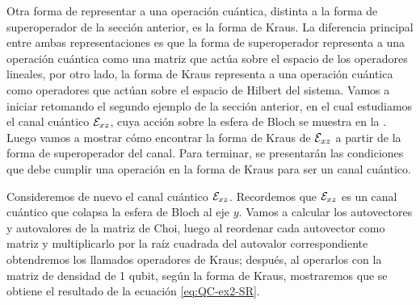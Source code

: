 Otra forma de representar a una operación cuántica, distinta a la
forma de superoperador de la sección anterior, es la forma de Kraus. 
La diferencia principal entre ambas representaciones 
es que la forma de superoperador
representa a una operación cuántica como una matriz que 
actúa sobre el espacio de los operadores lineales, por otro lado,
la forma de Kraus representa a una operación cuántica 
como operadores que actúan sobre el espacio de 
Hilbert del sistema. Vamos a iniciar retomando el segundo 
ejemplo de la sección anterior, en el cual estudiamos 
el canal cuántico $\mathcal{E}_{xz}$, cuya acción sobre la esfera
de Bloch se muestra en la .
Luego vamos a mostrar cómo encontrar la forma de Kraus de $\mathcal{E}_{xz}$ 
a partir de la forma de superoperador del canal.
Para terminar, se presentarán las condiciones 
que debe cumplir una operación en la forma de Kraus para
ser un canal cuántico.


Consideremos de nuevo el canal cuántico $\mathcal{E}_{xz}$.
Recordemos que $\mathcal{E}_{xz}$ es un canal cuántico
que colapsa la esfera de Bloch al eje $y$. 
Vamos a calcular los autovectores y autovalores de la 
matriz de Choi, luego al reordenar
cada autovector como matriz y multiplicarlo por la raíz cuadrada
del autovalor correspondiente obtendremos los llamados 
operadores de Kraus; después, al operarlos con la matriz 
de densidad de 1 qubit, según 
la forma de Kraus, mostraremos que se obtiene el 
resultado de la ecuación \eqref{eq:QC-ex2-SR}.

